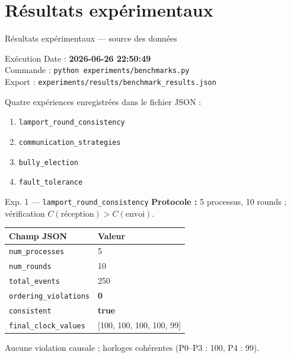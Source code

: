 \documentclass[11pt,french]{beamer}
\begin{document}
\section{Résultats expérimentaux}

\begin{frame}{Résultats expérimentaux --- source des données}
  \begin{block}{Exécution}
    \small
    Date : \textbf{2026-06-26 22:50:49} \\
    Commande : \texttt{python experiments/benchmarks.py} \\
    Export : \texttt{experiments/results/benchmark\_results.json}
  \end{block}

  \small
  Quatre expériences enregistrées dans le fichier JSON :
  \begin{enumerate}
    \item \texttt{lamport\_round\_consistency}
    \item \texttt{communication\_strategies}
    \item \texttt{bully\_election}
    \item \texttt{fault\_tolerance}
  \end{enumerate}
\end{frame}

\begin{frame}{Exp. 1 --- \texttt{lamport\_round\_consistency}}
  \textbf{Protocole :} 5 processus, 10 rounds ; vérification $C(\text{réception}) > C(\text{envoi})$.

  \vspace{0.2cm}
  \scriptsize
  \begin{tabular}{@{}ll@{}}
    \toprule
    \textbf{Champ JSON} & \textbf{Valeur} \\
    \midrule
    \texttt{num\_processes} & 5 \\
    \texttt{num\_rounds} & 10 \\
    \texttt{total\_events} & 250 \\
    \texttt{ordering\_violations} & \textbf{0} \\
    \texttt{consistent} & \textbf{true} \\
    \texttt{final\_clock\_values} & [100, 100, 100, 100, 99] \\
    \bottomrule
  \end{tabular}

  \vspace{0.3cm}
  \small Aucune violation causale ; horloges cohérentes (P0--P3 : 100, P4 : 99).
\end{frame}
\end{document}
